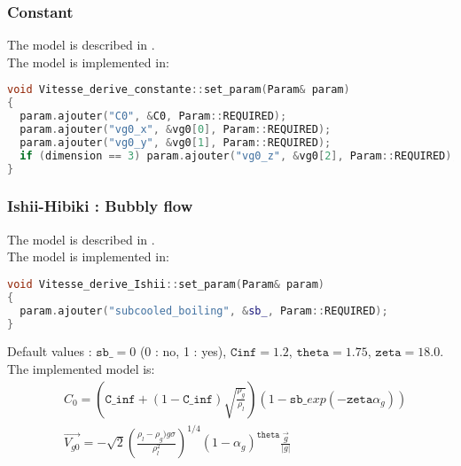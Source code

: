 \subsubsection{Constant}
The model is described in \cite{ishii1977one}.\\
The model is implemented in:
\begin{lstlisting}[language=c++]
void Vitesse_derive_constante::set_param(Param& param)
{
  param.ajouter("C0", &C0, Param::REQUIRED);
  param.ajouter("vg0_x", &vg0[0], Param::REQUIRED);
  param.ajouter("vg0_y", &vg0[1], Param::REQUIRED);
  if (dimension == 3) param.ajouter("vg0_z", &vg0[2], Param::REQUIRED);
}
\end{lstlisting}

\subsubsection{Ishii-Hibiki : Bubbly flow}
The model is described in \cite{HIBIKI2002707}.\\
The model is implemented in:
\begin{lstlisting}[language=c++]
void Vitesse_derive_Ishii::set_param(Param& param)
{
  param.ajouter("subcooled_boiling", &sb_, Param::REQUIRED);
}
\end{lstlisting}
Default values :  $\texttt{sb\_} = 0$ (0 : no, 1 : yes),  $\texttt{Cinf} = 1.2$, $\texttt{theta} = 1.75$, $\texttt{zeta} = 18.0$.\\
The implemented model is:
\begin{align}
  & C_0=(\texttt{C_{inf}}+(1-\texttt{C_{inf}})\sqrt{\frac{\rho_g}{\rho_l}})(1-\texttt{sb\_} exp(-\texttt{zeta}\alpha_g))\\
  & \vec{V_{g0}} =-\sqrt{2}(\frac{\rho_l-\rho_g)g\sigma}{\rho_l^2})^{1/4}(1-\alpha_g)^{\texttt{theta}} \frac{\vec{g}}{|g|}
\end{align}

